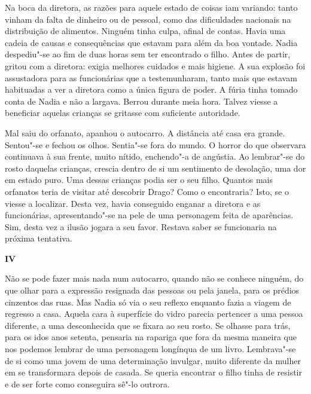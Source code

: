 Na boca da diretora, as razões para aquele estado de
coisas iam variando: tanto vinham da falta de dinheiro ou
de pessoal, como das dificuldades nacionais na distribuição de
alimentos. Ninguém tinha culpa, afinal de contas. Havia uma cadeia de
causas e consequências que estavam para além da boa vontade. Nadia
despediu"-se ao fim de duas horas sem ter encontrado o filho. Antes de
partir, gritou com a diretora: exigia melhores cuidados e mais higiene.
A sua explosão foi assustadora para as funcionárias que a
testemunharam, tanto mais que estavam habituadas a ver a diretora
como a única figura de poder. A fúria tinha tomado conta de Nadia e não
a largava. Berrou durante meia hora. Talvez viesse a beneficiar aquelas crianças se gritasse com suficiente autoridade.

Mal saiu do orfanato, apanhou o autocarro. A distância até casa era %
grande. Sentou"-se e fechou os olhos. Sentia"-se fora do mundo. O horror
do que observara continuava à sua frente, muito nítido, enchendo"-a de
angústia. Ao lembrar"-se do rosto daquelas crianças, crescia dentro de si
um sentimento de desolação, uma dor em estado puro. Uma dessas crianças
podia ser o seu filho. Quantos mais orfanatos teria de visitar até
descobrir Drago? Como o encontraria? Isto, se o viesse a localizar.
Desta vez, havia conseguido enganar a diretora e as funcionárias,
apresentando"-se na pele de uma personagem feita de aparências. Sim,
desta vez a ilusão jogara a seu favor. Restava saber se funcionaria na
próxima tentativa.

\pagebreak

\movetooddpage
\vspace*{1.8cm}
\noindent{}\textbf{IV}

\bigskip

\noindent{}Não se pode fazer mais nada num autocarro, quando não se conhece
ninguém, do que olhar para a expressão resignada das pessoas ou pela
janela, para os prédios cinzentos das ruas. Mas Nadia só via o seu
reflexo enquanto fazia a viagem de regresso a casa. Aquela cara à
superfície do vidro parecia pertencer a uma pessoa diferente, a uma
desconhecida que se fixara ao seu rosto. Se olhasse para trás, para os
idos anos setenta, pensaria na rapariga que fora da mesma maneira que
nos podemos lembrar de uma personagem longínqua de um livro. Lembrava"-se
de si como uma jovem de uma determinação invulgar, muito diferente da
mulher em se transformara depois de casada. Se queria encontrar o filho %
tinha de resistir e de ser forte como conseguira sê"-lo outrora.

